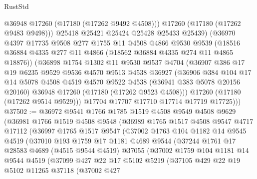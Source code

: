 \begin{lexlean}{RustStd}
\begin{coremodule}
            @36948
            @17260
            (@17180 (@17262 @9492 @4508)))
          @17260
          (@17180 (@17262 @9483 @9498)))
        @25418
        @25421
        @25424
        @25428
        @25433
        @25439)
      (@36970
        @4397
        @17735
        @9508
        @277
        @1755
        @11
        @4508
        @4866
        @9530
        @9539
        (@18516 @36884 @4335 @277 @11 @4866 (@18562 @36884 @4335 @274 @11 @4865 @18876))
        (@36898
          @1754
          @1302
          @11
          @9530
          @9537
          @4704
          (@36907
            @386
            @17
            @19
            @6235
            @9529
            @9536
            @4570
            @9513
            @4538
            @36927
            (@36906
              @384
              @104
              @17
              @14
              @5078
              @4508
              @4519
              @4570
              @9522
              @4538
              (@36941 @383 @5078 @20156 @20160)
              @36948
              @17260
              (@17180 (@17262 @9523 @4508)))
            @17260
            (@17180 (@17262 @9514 @9529)))
          @17704
          @17707
          @17710
          @17714
          @17719
          @17725)))
@37502 := @36972
    @9541
    @1766
    @1785
    @1519
    @4508
    @9549
    @4508
    @9629
    (@36981
      @1766
      @1519
      @4508
      @9548
      (@36989
        @1765
        @1517
        @4508
        @9547
        @4717
        @17112
        (@36997
          @1765
          @1517
          @9547
          (@37002
            @1763
            @104
            @1182
            @14
            @9545
            @4519
            (@37010
              @193
              @1759
              @17
              @1181
              @4689
              @9544
              (@37244
                @1761
                @17
                @28583
                @4689
                (@4515 @9544 @4519)
                @37055
                (@37002
                  @1759
                  @104
                  @1181
                  @14
                  @9544
                  @4519
                  (@37099
                    @427
                    @22
                    @17
                    @5102
                    @5219
                    (@37105
                      @429
                      @22
                      @19
                      @5102
                      @11265
                      @37118
                      (@37002
                        @427

\end{coremodule}
\end{lexlean}
